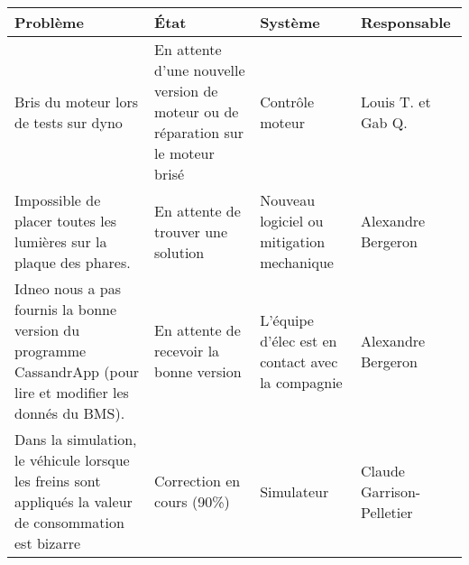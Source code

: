 \begin{tabularx}{\linewidth}{
    |>{\hsize=1.5\hsize}X|%
    >{\hsize=0.5\hsize}X|%
    >{\hsize=0.5\hsize}X|%
    >{\hsize=0.5\hsize}X|%
  }
    \hline
    \textbf{Problème} & \textbf{État} & \textbf{Système} & \textbf{Responsable}\\\hline
    Bris du moteur lors de tests sur dyno & En attente d'une nouvelle version de moteur ou de réparation sur le moteur brisé & Contrôle moteur & Louis T. et Gab Q.\\\hline
   Impossible de placer toutes les lumières sur la plaque des phares. & En attente de trouver une solution & Nouveau logiciel ou mitigation mechanique & Alexandre Bergeron \\\hline %
   Idneo nous a pas fournis la bonne version du programme CassandrApp (pour lire et modifier les donnés du BMS). & En attente de recevoir la bonne version & L'équipe d'élec est en contact avec la compagnie & Alexandre Bergeron \\\hline %
   Dans la simulation, le véhicule lorsque les freins sont appliqués la valeur de consommation est bizarre & Correction en cours (90\%) & Simulateur & Claude Garrison-Pelletier\\\hline %
  \end{tabularx}
    
    
